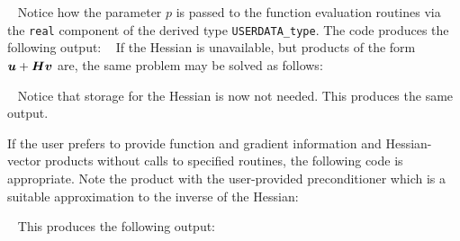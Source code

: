 \documentclass{galahad}
\begin{document}
{\tt \small
\VerbatimInput{\packageexample}
}
\noindent
Notice how the parameter $p$ is passed to the function evaluation
routines via the {\tt real} component of the derived type {\tt USERDATA\_type}.
The code produces the following output:
{\tt \small
\VerbatimInput{\packageresults}
}
\noindent
If the Hessian is unavailable, but products of the form
${\bm{u}} + {\bm{H}} {\bm{v}}$ are, the same problem may be solved as follows:

{\tt \small
\VerbatimInput{\packageexampleb}
}
\noindent
Notice that storage for the Hessian is now not needed.
This produces the same output.

If the user prefers to provide function and gradient information and
Hessian-vector products
without calls to specified routines, the following code is appropriate.
Note the product with the user-provided preconditioner
which is a suitable approximation to the inverse of the Hessian:

{\tt \small
\VerbatimInput{\packageexamplec}
}
\noindent
This produces the following output:
{\tt \small
\VerbatimInput{\packageresultsc}
}
\noindent
\end{document}
